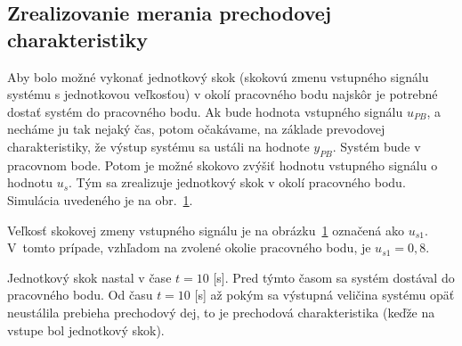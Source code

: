 \documentclass[a4paper, 10pt, ]{article}
\begin{document}
\subsection{Zrealizovanie merania prechodovej charakteristiky}


Aby bolo možné vykonať jednotkový skok (skokovú zmenu vstupného signálu systému s jednotkovou veľkosťou) v okolí pracovného bodu najskôr je potrebné dostať systém do pracovného bodu. Ak bude hodnota vstupného signálu $u_{PB}$, a necháme ju tak nejaký čas, potom očakávame, na základe prevodovej charakteristiky, že výstup systému sa ustáli na hodnote $y_{PB}$. Systém bude v pracovnom bode. Potom je možné skokovo zvýšiť hodnotu vstupného signálu o hodnotu $u_{s}$. Tým sa zrealizuje jednotkový skok v okolí pracovného bodu. Simulácia uvedeného je na obr.~\ref{graf6}.



\begin{figure}[t]
	\centering


    \vspace{-4mm}

	\caption{}
	\label{graf6}

    \vspace{-4mm}

\end{figure}

Veľkosť skokovej zmeny vstupného signálu je na obrázku~\ref{graf6} označená ako $u_{s1}$. V~tomto prípade, vzhľadom na zvolené okolie pracovného bodu, je $u_{s1} = 0,8$.

Jednotkový skok nastal v čase $t=10$ [s]. Pred týmto časom sa systém dostával do pracovného bodu. Od času $t=10$ [s] až pokým sa výstupná veličina systému opäť neustálila prebieha prechodový dej, to je prechodová charakteristika (keďže na vstupe bol jednotkový skok).



\begin{figure}[t]
	\centering


    \vspace{-4mm}

	\caption{}
	\label{graf7}

    \vspace{-4mm}

\end{figure}
\end{document}
